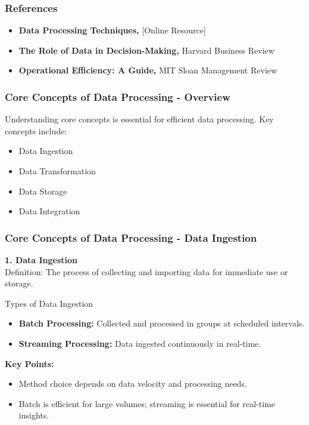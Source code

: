 \documentclass[aspectratio=169]{beamer}
\begin{document}
\begin{frame}[fragile]
    \frametitle{References}
    \begin{itemize}
        \item \textbf{Data Processing Techniques,} [Online Resource]
        \item \textbf{The Role of Data in Decision-Making,} Harvard Business Review
        \item \textbf{Operational Efficiency: A Guide,} MIT Sloan Management Review
    \end{itemize}
\end{frame}

\begin{frame}[fragile]
    \frametitle{Core Concepts of Data Processing - Overview}
    Understanding core concepts is essential for efficient data processing. Key concepts include:
    \begin{itemize}
        \item Data Ingestion
        \item Data Transformation
        \item Data Storage
        \item Data Integration
    \end{itemize}
\end{frame}

\begin{frame}[fragile]
    \frametitle{Core Concepts of Data Processing - Data Ingestion}
    \textbf{1. Data Ingestion} \\
    Definition: The process of collecting and importing data for immediate use or storage.
    \begin{block}{Types of Data Ingestion}
        \begin{itemize}
            \item \textbf{Batch Processing:} Collected and processed in groups at scheduled intervals.
            \item \textbf{Streaming Processing:} Data ingested continuously in real-time.
        \end{itemize}
    \end{block}
    \textbf{Key Points:}
    \begin{itemize}
        \item Method choice depends on data velocity and processing needs.
        \item Batch is efficient for large volumes; streaming is essential for real-time insights.
    \end{itemize}
\end{frame}
\end{document}
